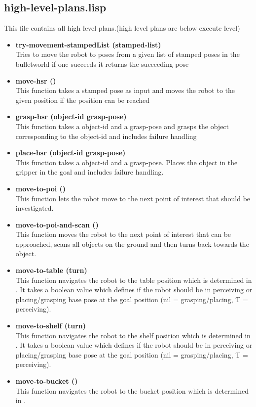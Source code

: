 \documentclass[main.tex]{subfiles}
\begin{document}
	    \subsection{high-level-plans.lisp}
	    \label{high-level}
	    This file contains all high level plans.(high level plans are below execute level)
	    \begin{itemize}
		\item \textbf{try-movement-stampedList (stamped-list)} \\
		Tries to move the robot to poses from a given list of stamped poses in the bulletworld if one succeeds it returns the succeeding pose 
	    \item \textbf{move-hsr ()} \\
	    This function takes a stamped pose as input and moves the robot to the given position if the position can be reached
	    \item \textbf{grasp-hsr (object-id grasp-pose)} \\
	    This function takes a object-id and a grasp-pose and grasps the object corresponding to the object-id and includes failure handling
	    \item \textbf{place-hsr (object-id grasp-pose)} \\
	    This function takes a object-id and a grasp-pose. Places the object in the gripper in the goal and includes failure handling.
	    \item \textbf{move-to-poi ()} \\
	    This function lets the robot move to the next point of interest that should be investigated. 
	    \item \textbf{move-to-poi-and-scan ()} \\
	    This function moves the robot to the next point of interest that can be approached, scans all objects on the ground and then turns back towards the object.
	    \item \textbf{move-to-table (turn)} \\
	    This function navigates the robot to the table position which is determined in . It takes a boolean value which defines if the robot should be in perceiving or placing/grasping base pose at the goal position (nil = grasping/placing, T = perceiving). 
	    \item \textbf{move-to-shelf (turn)} \\
	    This function navigates the robot to the shelf position which is determined in . It takes a boolean value which defines if the robot should be in perceiving or placing/grasping base pose at the goal position (nil = grasping/placing, T = perceiving).
	    \item \textbf{move-to-bucket ()} \\
	    This function navigates the robot to the bucket position which is determined in .  
		\end{itemize}
\end{document}
